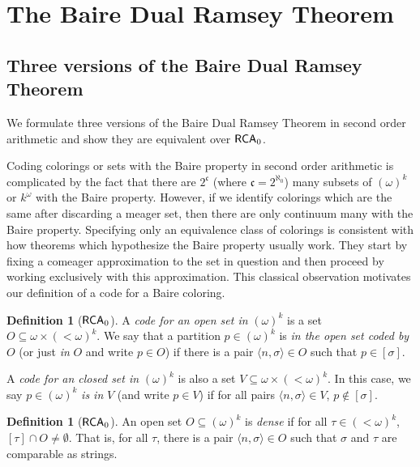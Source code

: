 \documentclass{amsart}
\theoremstyle{definition}
\newtheorem{defn}[thm]{Definition}
\theoremstyle{remark}
\newcommand{\system}[1]{\mbox{\fontfamily{cmss}\fontshape{n}\fontseries{m}%
    \selectfont#1}}
\newcommand{\RCA}{\system{RCA}\ensuremath{_0}}
\begin{document}
\section{The Baire Dual Ramsey Theorem}\label{sec:2}

\subsection{Three versions of the Baire Dual Ramsey Theorem}\label{sec:2.1} 

We formulate three versions of the Baire
Dual Ramsey Theorem in second order arithmetic and show they 
are equivalent over $\RCA$.

Coding colorings or sets with the Baire property in second order arithmetic is complicated by the fact that there are $2^{\mathfrak{c}}$ (where $\mathfrak{c} = 2^{\aleph_0}$) 
many subsets of $(\omega)^k$ or $k^{\omega}$ with the Baire property.  However, 
if we identify colorings which are the same after discarding a meager
set, then there are only 
continuum many with the Baire property.  Specifying only an equivalence class 
of colorings is consistent with how theorems 
which hypothesize the Baire property usually work. 
They start 
by fixing a comeager approximation to the set in question and then 
proceed by working exclusively with this approximation. This classical observation motivates our definition of a code for a Baire coloring. 


\begin{defn}[$\RCA$]
\label{defn:reverseopen}
A \textit{code for an open set in} $(\omega)^k$ is a set $O \subseteq
\omega \times (<\omega)^k$. We say that a partition $p \in (\omega)^k$
is \textit{in the open set coded by} $O$ (or just \textit{in} $O$ and
write $p \in O$) if there is a pair $\langle n, \sigma \rangle \in O$ such that $p \in
[\sigma]$.

A \textit{code for an closed set in} $(\omega)^k$ is also a set $V \subseteq
\omega \times (<\omega)^k$. In this case, we say $p \in (\omega)^k$
\textit{is in} $V$ (and write $p \in V$) if for all pairs $\langle n, \sigma \rangle \in V$, $p \not \in
[\sigma]$.
\end{defn}

\begin{defn}[$\RCA$]
An open set $O \subseteq (\omega)^k$ is \textit{dense} if for all $\tau \in (<\omega)^k$, $[\tau] \cap O \neq \emptyset$. That is, for all $\tau$, there is a pair 
$\langle n, \sigma \rangle \in O$ such that $\sigma$ and $\tau$ are comparable as strings.
\end{defn}
\end{document}
